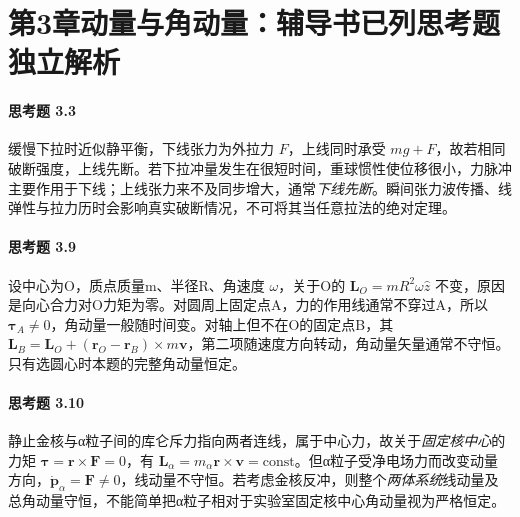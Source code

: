 \section*{第3章\quad 动量与角动量：辅导书已列思考题独立解析}
\paragraph{思考题 3.3}
缓慢下拉时近似静平衡，下线张力为外拉力 \(F\)，上线同时承受 \(mg+F\)，故若相同破断强度，上线先断。若下拉冲量发生在很短时间，重球惯性使位移很小，力脉冲主要作用于下线；上线张力来不及同步增大，通常\emph{下线先断}。瞬间张力波传播、线弹性与拉力历时会影响真实破断情况，不可将其当任意拉法的绝对定理。

\paragraph{思考题 3.9}
设中心为O，质点质量m、半径R、角速度 \(\omega\)，关于O的 \(\boldsymbol L_O=mR^2\omega\hat z\) 不变，原因是向心合力对O力矩为零。对圆周上固定点A，力的作用线通常不穿过A，所以 \(\boldsymbol\tau_A\ne0\)，角动量一般随时间变。对轴上但不在O的固定点B，其 \(\boldsymbol L_B=\boldsymbol L_O+(\boldsymbol r_O-\boldsymbol r_B)\times m\boldsymbol v\)，第二项随速度方向转动，角动量矢量通常不守恒。只有选圆心时本题的完整角动量恒定。

\paragraph{思考题 3.10}
静止金核与α粒子间的库仑斥力指向两者连线，属于中心力，故关于\emph{固定核中心}的力矩 \(\boldsymbol\tau=\boldsymbol r\times\boldsymbol F=0\)，有 \(\boxed{\boldsymbol L_\alpha=m_\alpha\boldsymbol r\times\boldsymbol v=\mathrm{const}}\)。但α粒子受净电场力而改变动量方向，\(\dot{\boldsymbol p}_\alpha=\boldsymbol F\ne0\)，线动量不守恒。若考虑金核反冲，则整个\emph{两体系统}线动量及总角动量守恒，不能简单把α粒子相对于实验室固定核中心角动量视为严格恒定。
